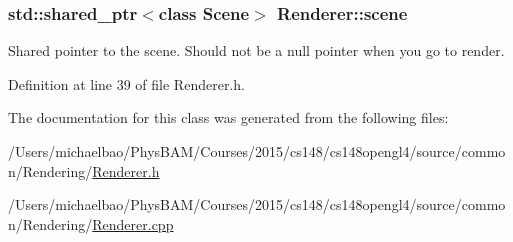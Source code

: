 \subsubsection[{scene}]{\setlength{\rightskip}{0pt plus 5cm}std\+::shared\+\_\+ptr$<$class {\bf Scene}$>$ Renderer\+::scene\hspace{0.3cm}{\ttfamily [protected]}}\label{class_renderer_a65178695d48824d3afd6fe40fd4915b6}


Shared pointer to the scene. Should not be a null pointer when you go to render. 



Definition at line 39 of file Renderer.\+h.



The documentation for this class was generated from the following files\+:\begin{DoxyCompactItemize}
\item 
/\+Users/michaelbao/\+Phys\+B\+A\+M/\+Courses/2015/cs148/cs148opengl4/source/common/\+Rendering/\hyperlink{_renderer_8h}{Renderer.\+h}\item 
/\+Users/michaelbao/\+Phys\+B\+A\+M/\+Courses/2015/cs148/cs148opengl4/source/common/\+Rendering/\hyperlink{_renderer_8cpp}{Renderer.\+cpp}\end{DoxyCompactItemize}
